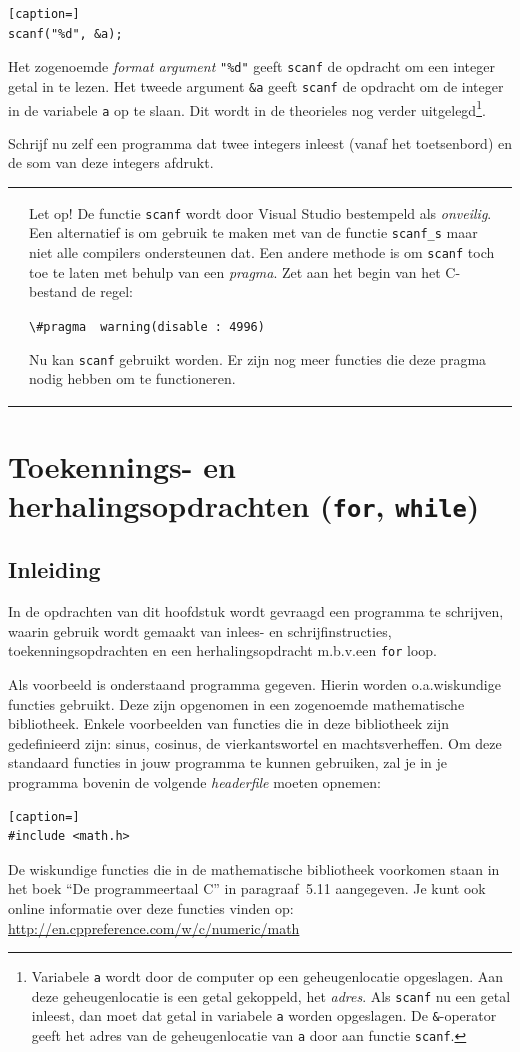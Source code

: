 \documentclass[a4paper,10pt,fleqn,twoside]{article}
\newcommand{\letopscanf}{%
\vspace{4ex plus 1ex minus 1ex}
\begin{mdframed}[outerlinewidth = 1 ,%
roundcorner = 4 pt,%
leftmargin = 40,%
rightmargin = 40,%
backgroundcolor = yellow!40,%
outerlinecolor = red!70!black,%
innertopmargin = \topskip,%
splittopskip = \topskip,%
]
\begin{tabularx}{\linewidth}{m{1cm}X}
\Large\leftpointright & Let op! De functie \lstinline|scanf| wordt door Visual Studio bestempeld als \emph{onveilig}. Een alternatief is om gebruik te maken met van de functie \lstinline|scanf_s| maar niet alle compilers ondersteunen dat. Een andere methode is om \lstinline|scanf| toch toe te laten met behulp van een \emph{pragma}. Zet aan het begin van het C-bestand de regel:

\medskip
\lstinline|\#pragma|\ \ \lstinline|warning(disable : 4996)|
\medskip

Nu kan \lstinline{scanf} gebruikt worden. Er zijn nog meer functies die deze pragma nodig hebben om te functioneren.
\end{tabularx}
\end{mdframed}
\vspace{4ex plus 1ex minus 1ex}
}
\begin{document}
\begin{lstlisting}[caption=]
scanf("%d", &a);
\end{lstlisting}

Het  zogenoemde \textsl{format argument} \lstinline|"%d"| geeft \lstinline|scanf| de opdracht om een integer getal in te lezen. Het tweede argument \lstinline|&a| geeft \lstinline|scanf| de opdracht om de integer in de variabele \lstinline|a| op te slaan. Dit wordt in de theorieles nog verder uitgelegd\footnote{Variabele \lstinline|a| wordt door de computer op een geheugenlocatie opgeslagen. Aan deze geheugenlocatie is een getal gekoppeld, het \textsl{adres}. Als \lstinline|scanf| nu een getal inleest, dan moet dat getal in variabele \lstinline|a| worden opgeslagen. De \lstinline|&|-operator geeft het adres van de geheugenlocatie van \lstinline|a| door aan functie \lstinline|scanf|.}.

Schrijf nu zelf een programma dat twee integers inleest (vanaf het toetsenbord) en de som van deze integers afdrukt.

\bigskip
\letopscanf


\clearpage
\section{Toekennings- en herhalingsopdrachten (\texttt{for}, \texttt{while})}

\subsection{Inleiding}

In de opdrachten van dit hoofdstuk wordt gevraagd een programma te schrijven, waarin gebruik wordt gemaakt van inlees- en schrijfinstructies, toekenningsopdrachten en een herhalingsopdracht m.b.v.\@ een \lstinline|for| loop. 

Als voorbeeld is onderstaand programma gegeven. Hierin worden o.a.\@ wiskundige functies gebruikt. Deze zijn opgenomen in een zogenoemde mathematische bibliotheek. Enkele voorbeelden van functies die in deze bibliotheek zijn gedefinieerd zijn: sinus, cosinus, de vierkantswortel en machtsverheffen. Om deze standaard functies in jouw programma te kunnen gebruiken, zal je in je programma bovenin de volgende \textsl{headerfile} moeten opnemen: 

\begin{lstlisting}[caption=]
#include <math.h>
\end{lstlisting}

De wiskundige functies die in de mathematische bibliotheek voorkomen staan in het boek ``De programmeertaal C'' in paragraaf~5.11 aangegeven. Je kunt ook online informatie over deze functies vinden op: \url{http://en.cppreference.com/w/c/numeric/math} 
\end{document}
